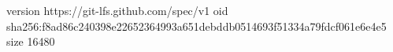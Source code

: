version https://git-lfs.github.com/spec/v1
oid sha256:f8ad86c240398e22652364993a651debddb0514693f51334a79fdcf061e6e4e5
size 16480
